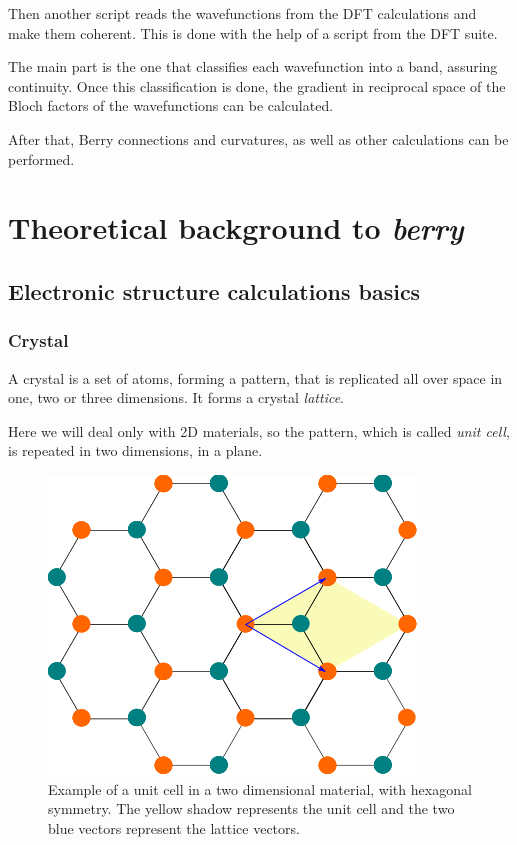 \documentclass[a4paper,12pt]{report}
\begin{document}
Then another script reads the wavefunctions from the DFT calculations and make them coherent.
This is done with the help of a script from the DFT suite.

The main part is the one that classifies each wavefunction into a band, assuring continuity.
Once this classification is done, the gradient in reciprocal space of the Bloch factors
of the wavefunctions can be calculated.

After that, Berry connections and curvatures, as well as other calculations can be performed.


\chapter{Theoretical background to \emph{berry}}

\section{Electronic structure calculations basics}

\subsection*{Crystal}
A crystal is a set of atoms, forming a pattern, that is replicated all over space in one, two or three dimensions.
It forms a crystal \emph{lattice}.

Here we will deal only with 2D materials, so the pattern, which is called \emph{unit cell},
is repeated in two dimensions, in a plane.

\begin{figure}
 \centering
 \includegraphics[scale=0.5,keepaspectratio=true]{figures/unitcell_honeycomb.png}
 \caption{Example of a unit cell in a two dimensional material, with hexagonal symmetry.
 The yellow shadow represents the unit cell and the two blue vectors represent the lattice vectors.}
 \label{fig:unitcell}
\end{figure}
\end{document}
